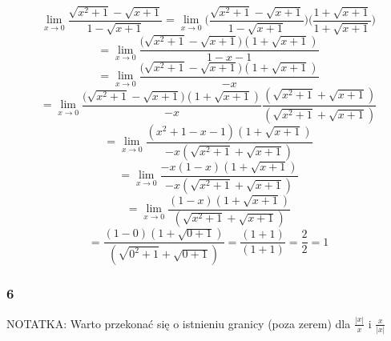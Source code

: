\documentclass{article}
\begin{document}
\begin{equation*}
    \lim_{x \to 0} \frac{\sqrt{x^2 + 1} - \sqrt{x + 1}}{1 - \sqrt{x + 1}} = \lim_{x \to 0} \Bigg(\frac{\sqrt{x^2 + 1} - \sqrt{x + 1}}{1 - \sqrt{x + 1}}\Bigg) \Bigg(\frac{1 + \sqrt{x + 1}}{1 + \sqrt{x + 1}}\Bigg)
\end{equation*}
\begin{equation*}
    = \lim_{x \to 0} \frac{\Big(\sqrt{x^2 + 1} - \sqrt{x + 1}\Big)(1 + \sqrt{x + 1})}{1 - x - 1}
\end{equation*}
\begin{equation*}
    = \lim_{x \to 0} \frac{\Big(\sqrt{x^2 + 1} - \sqrt{x + 1}\Big)(1 + \sqrt{x + 1})}{-x}
\end{equation*}
\begin{equation*}
    = \lim_{x \to 0} \frac{\Big(\sqrt{x^2 + 1} - \sqrt{x + 1}\Big)(1 + \sqrt{x + 1})}{-x} \frac{(\sqrt{x^2 + 1} + \sqrt{x + 1})}{(\sqrt{x^2 + 1} + \sqrt{x + 1})}
\end{equation*}
\begin{equation*}
    = \lim_{x \to 0} \frac{(x^2 + 1 -x - 1)(1 + \sqrt{x + 1})}{-x(\sqrt{x^2 + 1} + \sqrt{x + 1})}
\end{equation*}
\begin{equation*}
    = \lim_{x \to 0} \frac{-x(1 - x)(1 + \sqrt{x + 1})}{-x(\sqrt{x^2 + 1} + \sqrt{x + 1})}
\end{equation*}
\begin{equation*}
    = \lim_{x \to 0} \frac{(1 - x)(1 + \sqrt{x + 1})}{(\sqrt{x^2 + 1} + \sqrt{x + 1})}
\end{equation*}
\begin{equation*}
    = \frac{(1 - 0)(1 + \sqrt{0 + 1})}{(\sqrt{0^2 + 1} + \sqrt{0 + 1})} = \frac{(1 + 1)}{(1 + 1)} = \frac{2}{2} = 1
\end{equation*}


\subsubsection*{6}

\begin{center}
    NOTATKA: Warto przekonać się o istnieniu granicy (poza zerem) dla \(\frac{|x|}{x}\) i \(\frac{x}{|x|}\)
\end{center}
\end{document}
